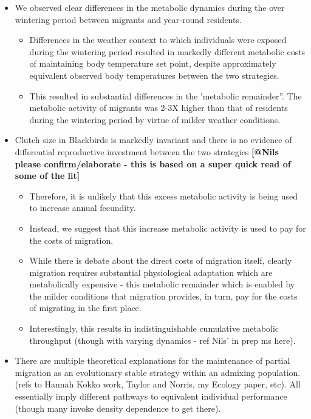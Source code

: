 \documentclass[
]{article}
\providecommand{\tightlist}{%
  \setlength{\itemsep}{0pt}\setlength{\parskip}{0pt}}
\begin{document}
\begin{itemize}
\tightlist
\item
  We observed clear differences in the metabolic dynamics during the
  over wintering period between migrants and year-round residents.

  \begin{itemize}
  \tightlist
  \item
    Differences in the weather context to which individuals were exposed
    during the wintering period resulted in markedly different metabolic
    costs of maintaining body temperature set point, despite
    approximately equivalent observed body temperatures between the two
    strategies.
  \item
    This resulted in substantial differences in the 'metabolic
    remainder''. The metabolic activity of migrants was 2-3X higher than
    that of residents during the wintering period by virtue of milder
    weather conditions.
  \end{itemize}
\item
  Clutch size in Blackbirds is markedly invariant and there is no
  evidence of differential reproductive investment between the two
  strategies \textbf{{[}@Nils please confirm/elaborate - this is based
  on a super quick read of some of the lit{]}}

  \begin{itemize}
  \tightlist
  \item
    Therefore, it is unlikely that this excess metabolic activity is
    being used to increase annual fecundity.
  \item
    Instead, we suggest that this increase metabolic activity is used to
    pay for the costs of migration.
  \item
    While there is debate about the direct costs of migration itself,
    clearly migration requires substantial physiological adaptation
    which are metabolically expensive - this metabolic remainder which
    is enabled by the milder conditions that migration provides, in
    turn, pay for the costs of migrating in the first place.
  \item
    Interestingly, this results in indistinguishable cumulative
    metabolic throughput (though with varying dynamics - ref Nils' in
    prep ms here).
  \end{itemize}
\item
  There are multiple theoretical explanations for the maintenance of
  partial migration as an evolutionary stable strategy within an
  admixing population. (refs to Hannah Kokko work, Taylor and Norris, my
  Ecology paper, etc). All essentially imply different pathways to
  equivalent individual performance (though many invoke density
  dependence to get there).


\end{itemize}
\end{document}
